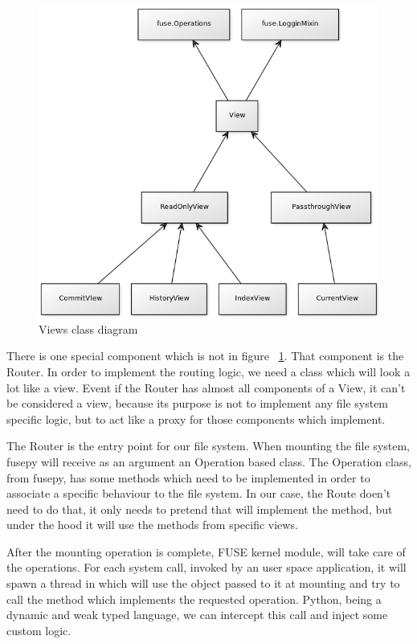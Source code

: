 \begin{figure}[h]
  \begin{center}
    \includegraphics[width=15cm]{concurrency/views-gitfs.png}
  \end{center}
  \caption{Views class diagram}
  \label{fig:views_diagram}
\end{figure}

There is one special component which is not in figure ~\ref{fig:views_diagram}. That component is the Router. In order to implement the routing logic, we need a class which will look a lot like a view. Event if the Router has almost all components of a View, it can't be considered a view, because its purpose is not to implement any file system specific logic, but to act like a proxy for those components which implement.

The Router is the entry point for our file system. When mounting the file system, fusepy will receive as an argument an Operation based class. The Operation class, from fusepy, has some methods which need to be implemented in order to associate a specific behaviour to the file system. In our case, the Route doen't need to do that, it only needs to pretend that will implement the method, but under the hood it will use the methods from specific views.

After the mounting operation is complete, FUSE kernel module, will take care of the operations. For each system call, invoked by an user space application, it will spawn a thread in which will use the object passed to it at mounting and try to call the method which implements the requested operation. Python, being a dynamic and weak typed language, we can intercept this call and inject some custom logic. 


